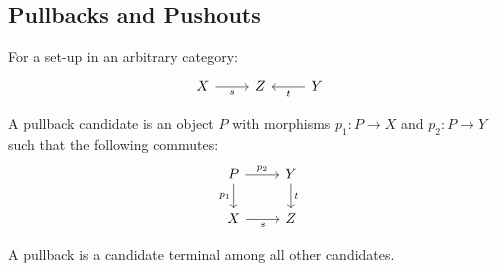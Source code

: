 \subsection{Pullbacks and Pushouts}

\begin{definition}\label{def:pullback}
  For a set-up in an arbitrary category:
  \parencite{leinster:basic_category_theory}
  \[\begin{tikzcd}[ampersand replacement=\&]
    X \& Z \& Y
    \arrow["t", from=1-3, to=1-2]
    \arrow["s"', from=1-1, to=1-2]
  \end{tikzcd}\]

  A pullback candidate is an object $P$ with morphisms $p_1:P\to X$ and
  $p_2:P\to Y$ such that the following commutes:
  \[\begin{tikzcd}[ampersand replacement=\&]
    P \& Y \\
    X \& Z
    \arrow["t", from=1-2, to=2-2]
    \arrow["s"', from=2-1, to=2-2]
    \arrow["{p_2}", from=1-1, to=1-2]
    \arrow["{p_1}"', from=1-1, to=2-1]
  \end{tikzcd}\]

  A pullback is a candidate terminal among all other candidates.
\end{definition}